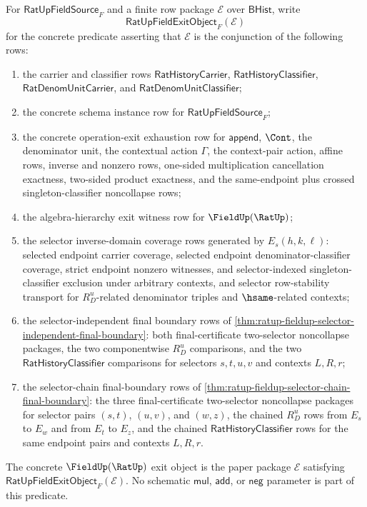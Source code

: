 \begin{definition}
\label{def:ratup-fieldup-concrete-exit-object}
For $\mathsf{RatUpFieldSource}_F$ and a finite row package $\mathcal E$ over
$\mathsf{BHist}$, write
$$
\mathsf{RatUpFieldExitObject}_F(\mathcal E)
$$
for the concrete predicate asserting that $\mathcal E$ is the conjunction of
the following rows:
\begin{enumerate}
  \item the carrier and classifier rows
  $\mathsf{RatHistoryCarrier}$, $\mathsf{RatHistoryClassifier}$,
  $\mathsf{RatDenomUnitCarrier}$, and
  $\mathsf{RatDenomUnitClassifier}$;
  \item the concrete schema instance row for $\mathsf{RatUpFieldSource}_F$;
  \item the concrete operation-exit exhaustion row for $\mathsf{append}$,
  $\Cont$, the denominator unit, the contextual action $\Gamma$, the
  context-pair action, affine rows, inverse and nonzero rows, one-sided
  multiplication cancellation exactness, two-sided product exactness, and the
  same-endpoint plus crossed singleton-classifier noncollapse rows;
  \item the algebra-hierarchy exit witness row for $\FieldUp(\RatUp)$;
  \item the selector inverse-domain coverage rows generated by
  $E_s(h,k,\ell)$: selected endpoint carrier coverage, selected endpoint
  denominator-classifier coverage, strict endpoint nonzero witnesses, and
  selector-indexed singleton-classifier exclusion under arbitrary contexts, and
  selector row-stability transport for $R_D^u$-related denominator triples and
  $\hsame$-related contexts;
  \item the selector-independent final boundary rows of
  \autoref{thm:ratup-fieldup-selector-independent-final-boundary}: both
  final-certificate two-selector noncollapse packages, the two componentwise
  $R_D^u$ comparisons, and the two
  $\mathsf{RatHistoryClassifier}$ comparisons for selectors $s,t,u,v$ and
  contexts $L,R,r$;
  \item the selector-chain final-boundary rows of
  \autoref{thm:ratup-fieldup-selector-chain-final-boundary}: the three
  final-certificate two-selector noncollapse packages for selector pairs
  $(s,t)$, $(u,v)$, and $(w,z)$, the chained $R_D^u$ rows from $E_s$ to $E_w$
  and from $E_t$ to $E_z$, and the chained
  $\mathsf{RatHistoryClassifier}$ rows for the same endpoint pairs and contexts
  $L,R,r$.
\end{enumerate}

The concrete $\FieldUp(\RatUp)$ exit object is the paper package $\mathcal E$
satisfying $\mathsf{RatUpFieldExitObject}_F(\mathcal E)$. No schematic
$\mathsf{mul}$, $\mathsf{add}$, or $\mathsf{neg}$ parameter is part of this
predicate.
\end{definition}

